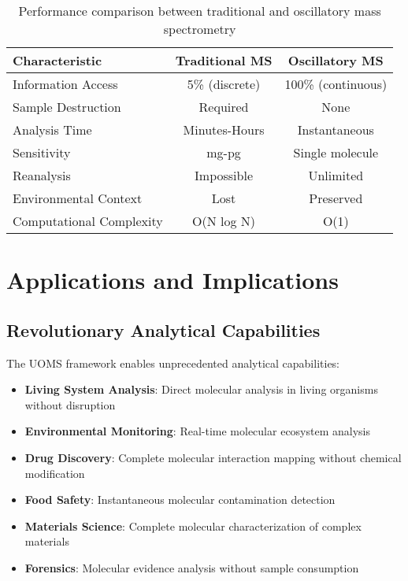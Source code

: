 \documentclass[12pt,a4paper]{article}
\begin{document}
\begin{table}[H]
\centering
\begin{tabular}{|l|c|c|}
\hline
\textbf{Characteristic} & \textbf{Traditional MS} & \textbf{Oscillatory MS} \\
\hline
Information Access & 5\% (discrete) & 100\% (continuous) \\
Sample Destruction & Required & None \\
Analysis Time & Minutes-Hours & Instantaneous \\
Sensitivity & mg-pg & Single molecule \\
Reanalysis & Impossible & Unlimited \\
Environmental Context & Lost & Preserved \\
Computational Complexity & O(N log N) & O(1) \\
\hline
\end{tabular}
\caption{Performance comparison between traditional and oscillatory mass spectrometry}
\end{table}

\section{Applications and Implications}

\subsection{Revolutionary Analytical Capabilities}

The UOMS framework enables unprecedented analytical capabilities:

\begin{itemize}
\item \textbf{Living System Analysis}: Direct molecular analysis in living organisms without disruption
\item \textbf{Environmental Monitoring}: Real-time molecular ecosystem analysis
\item \textbf{Drug Discovery}: Complete molecular interaction mapping without chemical modification
\item \textbf{Food Safety}: Instantaneous molecular contamination detection
\item \textbf{Materials Science}: Complete molecular characterization of complex materials
\item \textbf{Forensics}: Molecular evidence analysis without sample consumption
\end{itemize}
\end{document}
